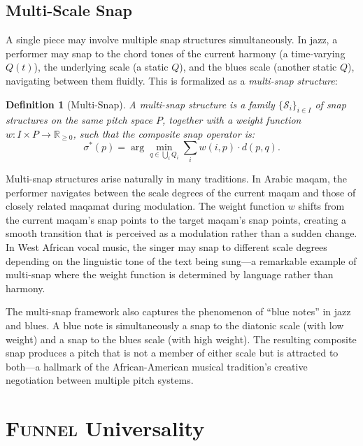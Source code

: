 \documentclass[cmj]{article}
\newtheorem{definition}{Definition}
\newcommand{\R}{\mathbb{R}}
\newcommand{\FUNNEL}{\textsc{Funnel}}
\begin{document}
\subsection{Multi-Scale Snap}

A single piece may involve multiple snap structures simultaneously. In jazz, a
performer may snap to the chord tones of the current harmony (a time-varying
$Q(t)$), the underlying scale (a static $Q$), and the blues scale (another
static $Q$), navigating between them fluidly. This is formalized as a
\emph{multi-snap structure}:

\begin{definition}[Multi-Snap]
A \emph{multi-snap structure} is a family $\{\mathcal{S}_i\}_{i \in I}$ of
snap structures on the same pitch space $P$, together with a weight function
$w: I \times P \to \R_{\geq 0}$, such that the composite snap operator is:
\[
  \sigma^*(p) = \arg\min_{q \in \bigcup_i Q_i} \sum_i w(i, p) \cdot d(p, q).
\]
\end{definition}

Multi-snap structures arise naturally in many traditions. In Arabic maqam,
the performer navigates between the scale degrees of the current maqam and
those of closely related maqamat during modulation. The weight function $w$
shifts from the current maqam's snap points to the target maqam's snap points,
creating a smooth transition that is perceived as a modulation rather than a
sudden change. In West African vocal music, the singer may snap to different
scale degrees depending on the linguistic tone of the text being sung---a
remarkable example of multi-snap where the weight function is determined by
language rather than harmony.

The multi-snap framework also captures the phenomenon of ``blue notes'' in
jazz and blues. A blue note is simultaneously a snap to the diatonic scale
(with low weight) and a snap to the blues scale (with high weight). The
resulting composite snap produces a pitch that is not a member of either
scale but is attracted to both---a hallmark of the African-American musical
tradition's creative negotiation between multiple pitch systems.

\section{\FUNNEL{} Universality}
\label{sec:funnel-sec}
\end{document}
